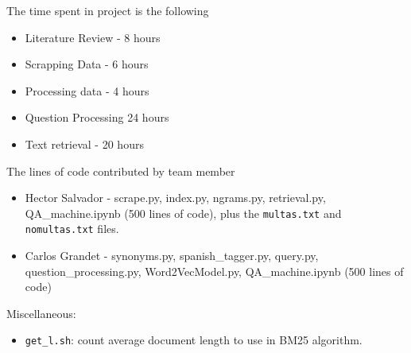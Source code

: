 \documentclass[letterpaper, margin=1in]{article}
\begin{document}
The time spent in project is the following
\begin{itemize}
\item Literature Review - 8 hours 
\item Scrapping Data - 6 hours 
\item Processing data - 4 hours
\item Question Processing 24 hours 
\item Text retrieval - 20 hours 
\end{itemize}

The lines of code contributed by team member
\begin{itemize}
\item Hector Salvador - scrape.py, index.py, ngrams.py, retrieval.py, QA{\_}machine.ipynb (500 lines of code), plus the \texttt{multas.txt} and \texttt{nomultas.txt} files.
\item Carlos Grandet - synonyms.py, spanish{\_}tagger.py, query.py, question{\_}processing.py,
Word2VecModel.py, QA{\_}machine.ipynb (500 lines of code)
\end{itemize}

Miscellaneous:
\begin{itemize}
\item \texttt{get{\_}l.sh}: count average document length to use in BM25 algorithm.
\end{itemize}
\end{document}
